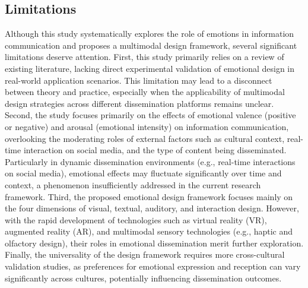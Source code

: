 \subsection{Limitations}
Although this study systematically explores the role of emotions in information communication and proposes a multimodal design framework, several significant limitations deserve attention. First, this study primarily relies on a review of existing literature, lacking direct experimental validation of emotional design in real-world application scenarios. This limitation may lead to a disconnect between theory and practice, especially when the applicability of multimodal design strategies across different dissemination platforms remains unclear. Second, the study focuses primarily on the effects of emotional valence (positive or negative) and arousal (emotional intensity) on information communication, overlooking the moderating roles of external factors such as cultural context, real-time interaction on social media, and the type of content being disseminated. Particularly in dynamic dissemination environments (e.g., real-time interactions on social media), emotional effects may fluctuate significantly over time and context, a phenomenon insufficiently addressed in the current research framework. Third, the proposed emotional design framework focuses mainly on the four dimensions of visual, textual, auditory, and interaction design. However, with the rapid development of technologies such as virtual reality (VR), augmented reality (AR), and multimodal sensory technologies (e.g., haptic and olfactory design), their roles in emotional dissemination merit further exploration. Finally, the universality of the design framework requires more cross-cultural validation studies, as preferences for emotional expression and reception can vary significantly across cultures, potentially influencing dissemination outcomes.

